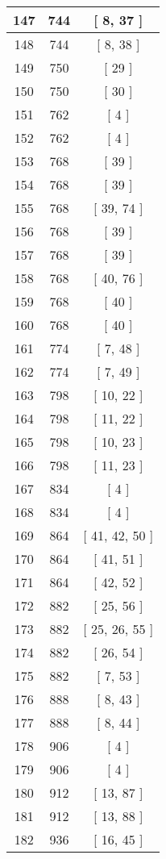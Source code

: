 \begin{center}
\begin{longtable}[H]{|| c c c ||}
\hline
147 & 744 & [ 8, 37 ] \\ 
\hline
148 & 744 & [ 8, 38 ] \\ 
\hline
149 & 750 & [ 29 ] \\ 
\hline
150 & 750 & [ 30 ] \\ 
\hline
151 & 762 & [ 4 ] \\ 
\hline
152 & 762 & [ 4 ] \\ 
\hline
153 & 768 & [ 39 ] \\ 
\hline
154 & 768 & [ 39 ] \\ 
\hline
155 & 768 & [ 39, 74 ] \\ 
\hline
156 & 768 & [ 39 ] \\ 
\hline
157 & 768 & [ 39 ] \\ 
\hline
158 & 768 & [ 40, 76 ] \\ 
\hline
159 & 768 & [ 40 ] \\ 
\hline
160 & 768 & [ 40 ] \\ 
\hline
161 & 774 & [ 7, 48 ] \\ 
\hline
162 & 774 & [ 7, 49 ] \\ 
\hline
163 & 798 & [ 10, 22 ] \\ 
\hline
164 & 798 & [ 11, 22 ] \\ 
\hline
165 & 798 & [ 10, 23 ] \\ 
\hline
166 & 798 & [ 11, 23 ] \\ 
\hline
167 & 834 & [ 4 ] \\ 
\hline
168 & 834 & [ 4 ] \\ 
\hline
169 & 864 & [ 41, 42, 50 ] \\ 
\hline
170 & 864 & [ 41, 51 ] \\ 
\hline
171 & 864 & [ 42, 52 ] \\ 
\hline
172 & 882 & [ 25, 56 ] \\ 
\hline
173 & 882 & [ 25, 26, 55 ] \\ 
\hline
174 & 882 & [ 26, 54 ] \\ 
\hline
175 & 882 & [ 7, 53 ] \\ 
\hline
176 & 888 & [ 8, 43 ] \\ 
\hline
177 & 888 & [ 8, 44 ] \\ 
\hline
178 & 906 & [ 4 ] \\ 
\hline
179 & 906 & [ 4 ] \\ 
\hline
180 & 912 & [ 13, 87 ] \\ 
\hline
181 & 912 & [ 13, 88 ] \\ 
\hline
182 & 936 & [ 16, 45 ] \\ 

\end{longtable}
\end{center}
